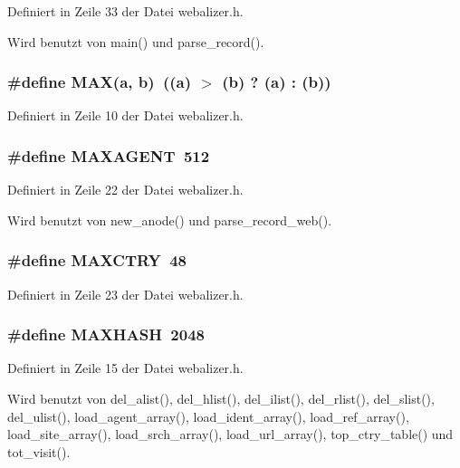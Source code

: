 Definiert in Zeile 33 der Datei webalizer.h.

Wird benutzt von main() und parse\_\-record().
\subsubsection{\setlength{\rightskip}{0pt plus 5cm}\#define MAX(a, b)~((a) $>$ (b) ? (a) : (b))}\label{webalizer_8h_fa99ec4acc4ecb2dc3c2d05da15d0e3f}




Definiert in Zeile 10 der Datei webalizer.h.
\subsubsection{\setlength{\rightskip}{0pt plus 5cm}\#define MAXAGENT~512}\label{webalizer_8h_cac54bd107b23b8a6433b11c185a884d}




Definiert in Zeile 22 der Datei webalizer.h.

Wird benutzt von new\_\-anode() und parse\_\-record\_\-web().
\subsubsection{\setlength{\rightskip}{0pt plus 5cm}\#define MAXCTRY~48}\label{webalizer_8h_1ee34374643e38b0f4ae8fff42539f32}




Definiert in Zeile 23 der Datei webalizer.h.
\subsubsection{\setlength{\rightskip}{0pt plus 5cm}\#define MAXHASH~2048}\label{webalizer_8h_381dfed3a446e2b49171f4593a701df8}




Definiert in Zeile 15 der Datei webalizer.h.

Wird benutzt von del\_\-alist(), del\_\-hlist(), del\_\-ilist(), del\_\-rlist(), del\_\-slist(), del\_\-ulist(), load\_\-agent\_\-array(), load\_\-ident\_\-array(), load\_\-ref\_\-array(), load\_\-site\_\-array(), load\_\-srch\_\-array(), load\_\-url\_\-array(), top\_\-ctry\_\-table() und tot\_\-visit().
